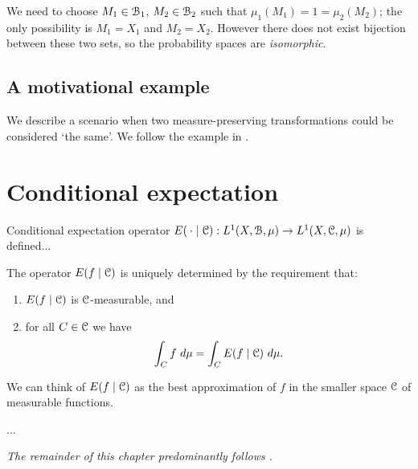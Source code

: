 We need to choose $M_1 \in \mathcal{B}_1$, $M_2 \in \mathcal{B}_2$ such that $\mu_1(M_1) = 1 = \mu_2(M_2)$; the only possibility is $M_1 = X_1$ and $M_2 = X_2$. However there does not exist bijection between these two sets, so the probability spaces are \emph{isomorphic}.

\subsection{A motivational example}
We describe a scenario when two measure-preserving transformations could be considered `the same'. We follow the example in \cite[p58]{walters:intro-to-ergodic-theory}.

\section{Conditional expectation}
\begin{definition}
	Conditional expectation operator $E(\:\cdot \mid \mathcal{C}) : L^1(X, \mathcal{B}, \mu) \to L^1(X, \mathcal{C}, \mu)$ is defined...
\end{definition}

The operator $E(f \mid \mathcal{C})$ is uniquely determined by the requirement that:
\begin{enumerate}
	\item $E(f \mid \mathcal{C})$ is $\mathcal{C}$-measurable, and
	\item for all $C \in \mathcal{C}$ we have
	\[
	\int_C{f\ d\mu} = \int_C{E(f \mid \C)\ d\mu}.
	\]
\end{enumerate}

We can think of $E(f \mid \mathcal{C})$ as the best approximation of $f$ in the smaller space $\mathcal{C}$ of measurable functions.~\cite[Lecture 21]{ergodic-lectures}

...

\emph{The remainder of this chapter predominantly follows \cite[Chapter 4]{walters:intro-to-ergodic-theory}.}

